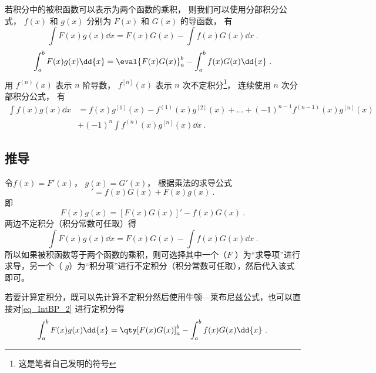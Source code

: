 

若积分中的被积函数可以表示为两个函数的乘积， 则我们可以使用分部积分公式， $f(x)$ 和 $g(x)$ 分别为 $F(x)$ 和 $G(x)$ 的导函数， 有
\begin{equation}\label{eq_IntBP_1}
\int F(x)g(x)\dd{x}  = F(x)G(x) - \int f(x)G(x)\dd{x}~.
\end{equation}
\begin{equation}
\int_a^b F(x)g(x) \dd{x}  = \eval{F(x)G(x)}_a^b - \int_a^b f(x)G(x) \dd{x}~.
\end{equation}
用 $f^{(n)}(x)$ 表示 $n$ 阶导数，  $f^{[n]}(x)$ 表示 $n$ 次不定积分\footnote{这是笔者自己发明的符号}， 连续使用 $n$ 次分部积分公式， 有
\begin{equation}
\begin{aligned}
\int f(x)g(x) \dd{x} &= f(x)g^{[1]}(x) - f^{(1)}(x)g^{[2]}(x) + \dots + (-1)^{n-1} f^{(n-1)}(x) g^{[n]}(x)\\
 &+ (-1)^n \int f^{(n)}(x) g^{[n]}(x) \dd{x}~.
\end{aligned}
\end{equation}

\subsection{推导}
令$f(x) = F'(x)$，  $g(x) = G'(x)$， 根据乘法的求导公式%
\begin{equation}
[F(x)G(x)]' = f(x)G(x) + F(x)g(x)~.
\end{equation}
即
\begin{equation}\label{eq_IntBP_2}
F(x)g(x) = [F(x)G(x)]' - f(x)G(x)~.
\end{equation}
两边不定积分（积分常数可任取）得
\begin{equation}\label{eq_IntBP_6}
\int F(x)g(x) \dd{x}  = F(x)G(x) - \int f(x)G(x) \dd{x}~.
\end{equation}
所以如果被积函数等于两个函数的乘积，则可选择其中一个（$F$ ）为“求导项”进行求导，另一个（ $g$）为“积分项”进行不定积分（积分常数可任取），然后代入该式即可。

若要计算定积分，既可以先计算不定积分然后使用牛顿—莱布尼兹公式，也可以直接对\autoref{eq_IntBP_2} 进行定积分得
\begin{equation}\label{eq_IntBP_4}
\int_a^b F(x)g(x) \dd{x}  = \qty[ F(x)G(x) ]_a^b - \int_a^b f(x)G(x) \dd{x}~.
\end{equation}

